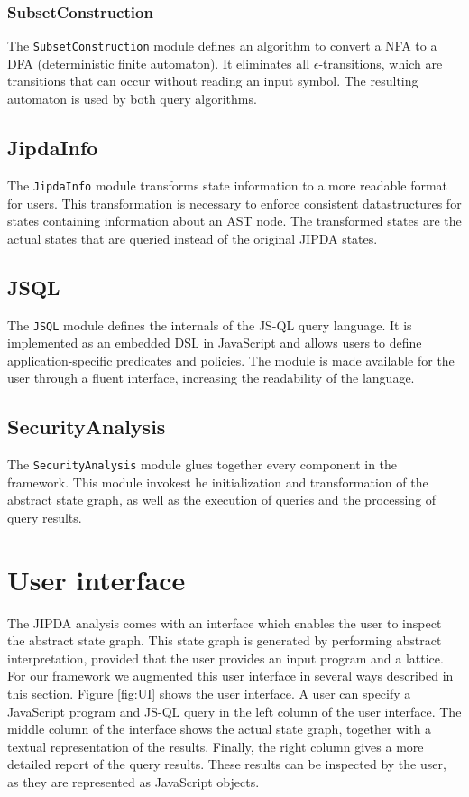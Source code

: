 \subsubsection*{SubsetConstruction}
The \texttt{SubsetConstruction} module defines an algorithm to convert a NFA to a DFA (deterministic finite automaton). It eliminates all $\epsilon$-transitions, which are transitions that can occur without reading an input symbol. The resulting automaton is used by both query algorithms.

\subsection*{JipdaInfo}
The \texttt{JipdaInfo} module transforms state information to a more readable format for users. This transformation is necessary to enforce consistent datastructures for states containing information about an AST node. The transformed states are the actual states that are queried instead of the original JIPDA states.

\subsection*{JSQL}
The \texttt{JSQL} module defines the internals of the JS-QL query language. It is implemented as an embedded DSL in JavaScript and allows users to define application-specific predicates and policies. The module is made available for the user through a fluent interface, increasing the readability of the language.

\subsection*{SecurityAnalysis}
The \texttt{SecurityAnalysis} module glues together every component in the framework. This module invokest he initialization and transformation of the abstract state graph, as well as the execution of queries and the processing of query results.

\section{User interface}
The JIPDA analysis comes with an interface which enables the user to inspect the abstract state graph. This state graph is generated by performing abstract interpretation, provided that the user provides an input program and a lattice. For our framework we augmented this user interface in several ways described in this section. Figure \ref{fig:UI} shows the user interface. A user can specify a JavaScript program and JS-QL query in the left column of the user interface. The middle column of the interface shows the actual state graph, together with a textual representation of the results. Finally, the right column gives a more detailed report of the query results. These results can be inspected by the user, as they are represented as JavaScript objects.

